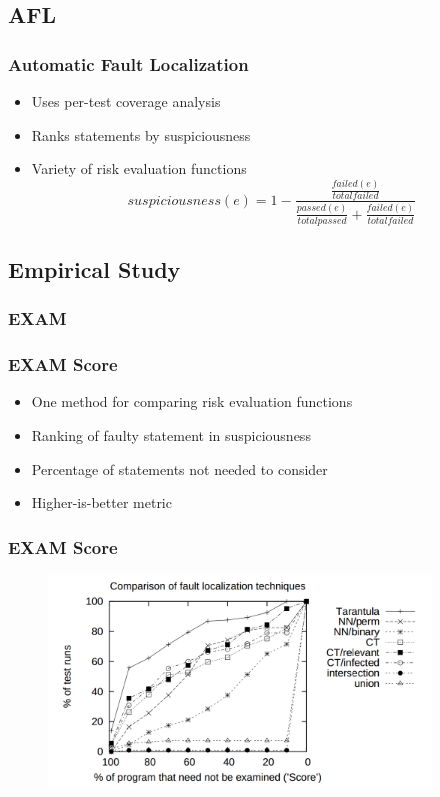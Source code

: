 \documentclass{beamer}
\begin{document}
	\subsection{AFL}
	\begin{frame}
	\frametitle{Automatic Fault Localization}
	\begin{itemize}
	  \item Uses per-test coverage analysis
	    \pause
	  \item Ranks statements by suspiciousness
	    \pause
	  \item Variety of risk evaluation functions
	  \begin{equation*}
	suspiciousness(e) = 1 - \frac{\frac{failed(e)}{total failed}}{\frac{passed(e)}{total passed} + \frac{failed(e)}{total failed}}
	  \end{equation*}
	\end{itemize}
	\end{frame}
	\subsection{Empirical Study}
	\subsubsection{EXAM}
	\begin{frame}
	\frametitle{EXAM Score}
	\begin{itemize}
	   	\item One method for comparing risk evaluation functions
	   	\pause
	   	\item Ranking of faulty statement in suspiciousness
	   	\pause
	   	\item Percentage of statements not needed to consider
	   	\pause
	   	\item Higher-is-better metric
	\end{itemize}
	\end{frame}
	\begin{frame}
	\frametitle{EXAM Score}
	\begin{figure}
		\label{tareff}
		\includegraphics[width=4in]{img/tareff}
	\end{figure}
	\end{frame}
\end{document}
